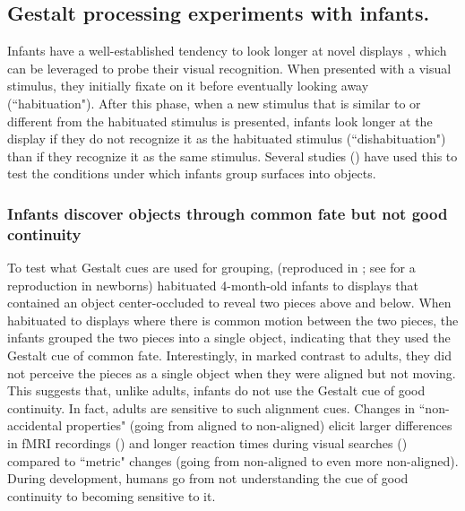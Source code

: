 \documentclass[10pt,letterpaper]{article}
\begin{document}
\subsection{Gestalt processing experiments with infants. \label{gestalt}}
Infants have a well-established tendency to look longer at novel displays \cite{fantz1964visual}, which can be leveraged to probe their visual recognition. When presented with a visual stimulus, they initially fixate on it before eventually looking away (``habituation"). After this phase, when a new stimulus that is similar to or different from the habituated stimulus is presented, infants look longer at the display if they do not recognize it as the habituated stimulus  (``dishabituation") than if they recognize it as the same stimulus. Several studies (\cite{kestenbaum1987perception, kellman1983perception}) have used this to test the conditions under which infants group surfaces into objects.

\subsubsection*{Infants discover objects through common fate but not good continuity}

To test what Gestalt cues are used for grouping, \cite{kellman1983perception} (reproduced in \cite{smith2003motion, johnson1996perception}; see \cite{valenza2006perceptual} for a reproduction in newborns) habituated 4-month-old infants to displays that contained an object center-occluded to reveal two pieces above and below. When habituated to displays where there is common motion between the two pieces, the infants grouped the two pieces into a single object, indicating that they used the Gestalt cue of common fate. Interestingly, in marked contrast to adults, they did not perceive the pieces as a single object when they were aligned but not moving. This suggests that, unlike adults, infants do not use the Gestalt cue of good continuity. In fact, adults are sensitive to such alignment cues. Changes in ``non-accidental properties" (going from aligned to non-aligned) elicit larger differences in fMRI recordings (\cite{kim2012greater}) and longer reaction times during visual searches (\cite{kubilius2017sensitivity}) compared to ``metric" changes (going from non-aligned to even more non-aligned). During development, humans go from not understanding the cue of good continuity to becoming sensitive to it.
\end{document}
